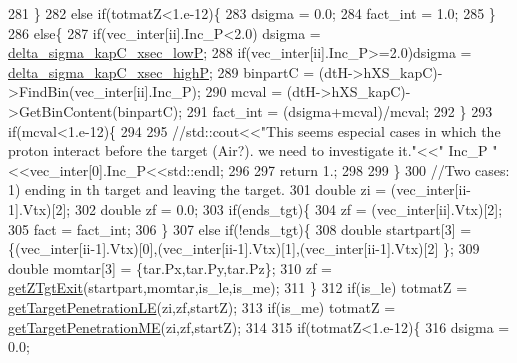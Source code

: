 \begin{DoxyCode}
281         \}
282         \textcolor{keywordflow}{else} \textcolor{keywordflow}{if}(totmatZ<1.e-12)\{
283           dsigma = 0.0;
284           fact\_int = 1.0;
285         \}
286         \textcolor{keywordflow}{else}\{
287           \textcolor{keywordflow}{if}(vec\_inter[ii].Inc\_P<2.0) dsigma = \hyperlink{class_neutrino_flux_reweight_1_1_target_attenuation_reweighter_abcfaf35e7861c941eb17a22a9fdc867d}{delta\_sigma\_kapC\_xsec\_lowP};
288           \textcolor{keywordflow}{if}(vec\_inter[ii].Inc\_P>=2.0)dsigma = \hyperlink{class_neutrino_flux_reweight_1_1_target_attenuation_reweighter_a1da8f3585af2ed5e282e6f2cd7e613f9}{delta\_sigma\_kapC\_xsec\_highP};
289           binpartC = (dtH->hXS\_kapC)->FindBin(vec\_inter[ii].Inc\_P);
290           mcval    = (dtH->hXS\_kapC)->GetBinContent(binpartC);
291           fact\_int = (dsigma+mcval)/mcval;
292         \}
293        \textcolor{keywordflow}{if}(mcval<1.e-12)\{
294        
295       \textcolor{comment}{//std::cout<<"This seems especial cases in which the proton interact before the target (Air?). we
       need to investigate it."<<" Inc\_P "<<vec\_inter[0].Inc\_P<<std::endl;}
296       
297       \textcolor{keywordflow}{return} 1.;
298       
299     \}
300         \textcolor{comment}{//Two cases: 1) ending in th target and leaving the target.}
301         \textcolor{keywordtype}{double} zi = (vec\_inter[ii-1].Vtx)[2];
302         \textcolor{keywordtype}{double} zf = 0.0;
303         \textcolor{keywordflow}{if}(ends\_tgt)\{     
304           zf = (vec\_inter[ii].Vtx)[2];    
305           fact = fact\_int;
306         \}
307         \textcolor{keywordflow}{else} \textcolor{keywordflow}{if}(!ends\_tgt)\{
308           \textcolor{keywordtype}{double} startpart[3] = \{(vec\_inter[ii-1].Vtx)[0],(vec\_inter[ii-1].Vtx)[1],(vec\_inter[ii-1].Vtx)[2]
      \};
309           \textcolor{keywordtype}{double} momtar[3]    = \{tar.Px,tar.Py,tar.Pz\};
310           zf  = \hyperlink{class_neutrino_flux_reweight_1_1_target_attenuation_reweighter_a1e7273b417c1013b777ab3532da5ef5e}{getZTgtExit}(startpart,momtar,is\_le,is\_me);
311         \}
312         \textcolor{keywordflow}{if}(is\_le) totmatZ = \hyperlink{class_neutrino_flux_reweight_1_1_target_attenuation_reweighter_a456b05db5e17fef740619e47c18eabcf}{getTargetPenetrationLE}(zi,zf,startZ);
313         \textcolor{keywordflow}{if}(is\_me) totmatZ = \hyperlink{class_neutrino_flux_reweight_1_1_target_attenuation_reweighter_a69653c6ab68bdf8836d80a302cb818c1}{getTargetPenetrationME}(zi,zf,startZ);
314       
315         \textcolor{keywordflow}{if}(totmatZ<1.e-12)\{
316           dsigma = 0.0;

\end{DoxyCode}
